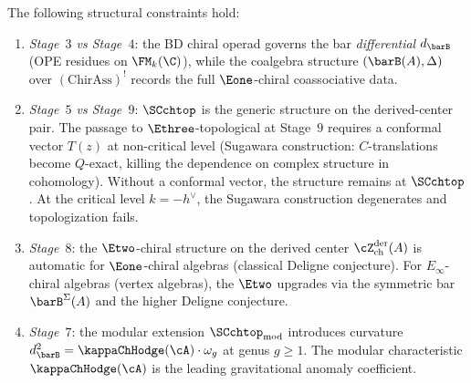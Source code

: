 \begin{proposition}
\smallskip\noindent
The following structural constraints hold:
\begin{enumerate}[label=\textup{(\roman*)}]
\item \emph{Stage~$3$ vs Stage~$4$}: the BD chiral operad governs
 the bar \emph{differential} $d_{\barB}$
 \textup{(}OPE residues on $\FM_k(\C)$\textup{)}, while the
 coalgebra structure $(\barB(A), \Delta)$ over
 $(\mathrm{ChirAss})^!$ records the full $\Eone$-chiral
 coassociative data.

\item \emph{Stage~$5$ vs Stage~$9$}: $\SCchtop$ is the generic
 structure on the derived-center pair. The passage to
 $\Ethree$-topological at Stage~$9$ requires a conformal vector
 $T(z)$ at non-critical level \textup{(}Sugawara construction:
 $C$-translations become $Q$-exact, killing the dependence on
 complex structure in cohomology\textup{)}.
 Without a conformal vector, the structure remains at $\SCchtop$.
 At the critical level $k = -h^\vee$, the Sugawara construction
 degenerates and topologization fails.

\item \emph{Stage~$8$}: the $\Etwo$-chiral structure on the derived
 center $\cZ^{\mathrm{der}}_{\mathrm{ch}}(A)$ is automatic for
 $\Eone$-chiral algebras \textup{(}classical Deligne
 conjecture\textup{)}. For $E_\infty$-chiral algebras
 \textup{(}vertex algebras\textup{)}, the $\Etwo$ upgrades
 via the symmetric bar $\barB^\Sigma(A)$ and the higher
 Deligne conjecture.

\item \emph{Stage~$7$}: the modular extension
 $\SCchtop_{\mathrm{mod}}$ introduces curvature
 $d_{\barB}^2 = \kappaChHodge(\cA) \cdot \omega_g$ at genus $g \ge 1$.
 The modular characteristic $\kappaChHodge(\cA)$ is the leading
 gravitational anomaly coefficient.
\end{enumerate}
\end{proposition}

